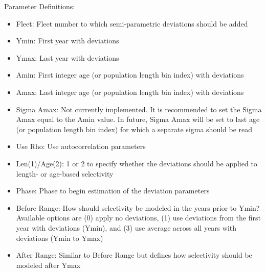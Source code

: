 Parameter Definitions:
\begin{itemize}
	\item Fleet: Fleet number to which semi-parametric deviations should be added
	\item Ymin: First year with deviations
	\item Ymax: Last year with deviations
	\item Amin: First integer age (or population length bin index) with deviations
	\item Amax: Last integer age (or population length bin index) with deviations
	\item Sigma Amax: Not currently implemented. It is recommended to set the Sigma Amax equal to the Amin value. In future, Sigma Amax will be set to last age (or population length bin index) for which a separate sigma should be read
	\item Use Rho: Use autocorrelation parameters
	\item Len(1)/Age(2): 1 or 2 to specify whether the deviations should be applied to length- or age-based selectivity
	\item Phase: Phase to begin estimation of the deviation parameters 
	\item Before Range: How should selectivity be modeled in the years prior to Ymin? Available options are (0) apply no deviations, (1) use deviations from the first year with deviations (Ymin), and (3) use average across all years with deviations (Ymin to Ymax)
	\item After Range: Similar to Before Range but defines how selectivity should be modeled after Ymax
\end{itemize}

